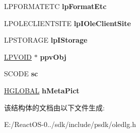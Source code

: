 \begin{DoxyCompactItemize}
\item 
\mbox{\label{structtag_o_l_e_u_i_i_n_s_e_r_t_o_b_j_e_c_t_w_a4da37ec4774da9ee520d7df2c872e9c8}} 
L\+P\+F\+O\+R\+M\+A\+T\+E\+TC {\bfseries lp\+Format\+Etc}
\item 
\mbox{\label{structtag_o_l_e_u_i_i_n_s_e_r_t_o_b_j_e_c_t_w_a3374802dbe86186f83f12b1aa2b9589e}} 
L\+P\+O\+L\+E\+C\+L\+I\+E\+N\+T\+S\+I\+TE {\bfseries lp\+I\+Ole\+Client\+Site}
\item 
\mbox{\label{structtag_o_l_e_u_i_i_n_s_e_r_t_o_b_j_e_c_t_w_a99b0983f345b175ed2252bbee5121632}} 
L\+P\+S\+T\+O\+R\+A\+GE {\bfseries lp\+I\+Storage}
\item 
\mbox{\label{structtag_o_l_e_u_i_i_n_s_e_r_t_o_b_j_e_c_t_w_adc0cb8e45ccbc24d83a60513513149a3}} 
\hyperlink{interfacevoid}{L\+P\+V\+O\+ID} $\ast$ {\bfseries ppv\+Obj}
\item 
\mbox{\label{structtag_o_l_e_u_i_i_n_s_e_r_t_o_b_j_e_c_t_w_a2b87ad433a9a1933be5fba83cb94d054}} 
S\+C\+O\+DE {\bfseries sc}
\item 
\mbox{\label{structtag_o_l_e_u_i_i_n_s_e_r_t_o_b_j_e_c_t_w_ad9d8911d48ebf1e9651aaacdae43de5e}} 
\hyperlink{interfacevoid}{H\+G\+L\+O\+B\+AL} {\bfseries h\+Meta\+Pict}
\end{DoxyCompactItemize}


该结构体的文档由以下文件生成\+:\begin{DoxyCompactItemize}
\item 
E\+:/\+React\+O\+S-\/0../sdk/include/psdk/oledlg.\+h\end{DoxyCompactItemize}
